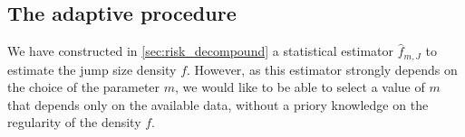 \begin{table}
\centering
{}
\caption{Speed of the optimal upper bound with respect to the regularity of $f$ and $f_\varepsilon$.}
\label{table:speed}

\end{table}
 


\subsection{The adaptive procedure}
\label{S:adaptive}

We have constructed in \cref{sec:risk_decompound} a statistical estimator $\hat f_{m, J}$ to estimate the jump size density $f$.
However, as this estimator strongly depends on the choice of the parameter $m$, we would like to be able to select a value of $m$ that depends only on the available data, without a priory knowledge on the regularity of the density $f$. \\

